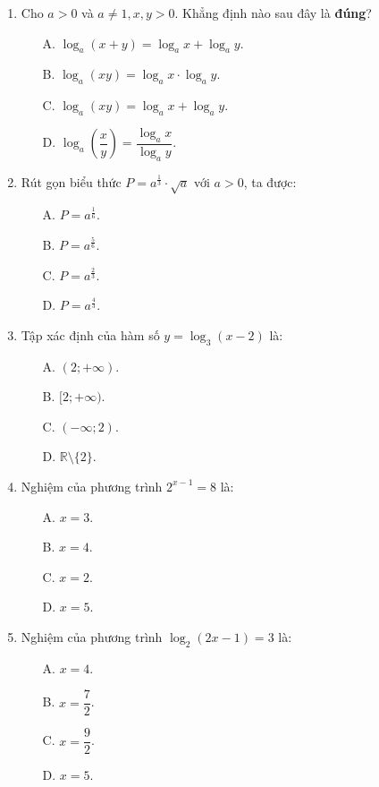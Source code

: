 \documentclass[12pt, a4paper]{article}
\begin{document}
\begin{enumerate}[leftmargin=0.8cm]
    \item Cho $a > 0$ và $a \ne 1, x, y > 0$. Khẳng định nào sau đây là \textbf{đúng}?
    \begin{enumerate}[leftmargin=0.6cm]
        \item[A.] $\log_a (x + y) = \log_a x + \log_a y$.
        \item[B.] $\log_a (x y) = \log_a x \cdot \log_a y$.
        \item[C.] $\log_a (x y) = \log_a x + \log_a y$.
        \item[D.] $\log_a \left(\dfrac{x}{y}\right) = \dfrac{\log_a x}{\log_a y}$.
    \end{enumerate}

    \item Rút gọn biểu thức $P = a^{\frac{1}{3}} \cdot \sqrt{a}$ với $a > 0$, ta được:
    \begin{enumerate}[leftmargin=0.6cm]
        \item[A.] $P = a^{\frac{1}{6}}$.
        \item[B.] $P = a^{\frac{5}{6}}$.
        \item[C.] $P = a^{\frac{2}{3}}$.
        \item[D.] $P = a^{\frac{4}{3}}$.
    \end{enumerate}

    \item Tập xác định của hàm số $y = \log_3 (x - 2)$ là:
    \begin{enumerate}[leftmargin=0.6cm]
        \item[A.] $(2; +\infty)$.
        \item[B.] $[2; +\infty)$.
        \item[C.] $(-\infty; 2)$.
        \item[D.] $\mathbb{R} \setminus \{2\}$.
    \end{enumerate}

    \item Nghiệm của phương trình $2^{x-1} = 8$ là:
    \begin{enumerate}[leftmargin=0.6cm]
        \item[A.] $x = 3$.
        \item[B.] $x = 4$.
        \item[C.] $x = 2$.
        \item[D.] $x = 5$.
    \end{enumerate}

    \item Nghiệm của phương trình $\log_2 (2x - 1) = 3$ là:
    \begin{enumerate}[leftmargin=0.6cm]
        \item[A.] $x = 4$.
        \item[B.] $x = \dfrac{7}{2}$.
        \item[C.] $x = \dfrac{9}{2}$.
        \item[D.] $x = 5$.
    \end{enumerate}


\end{enumerate}
\end{document}
